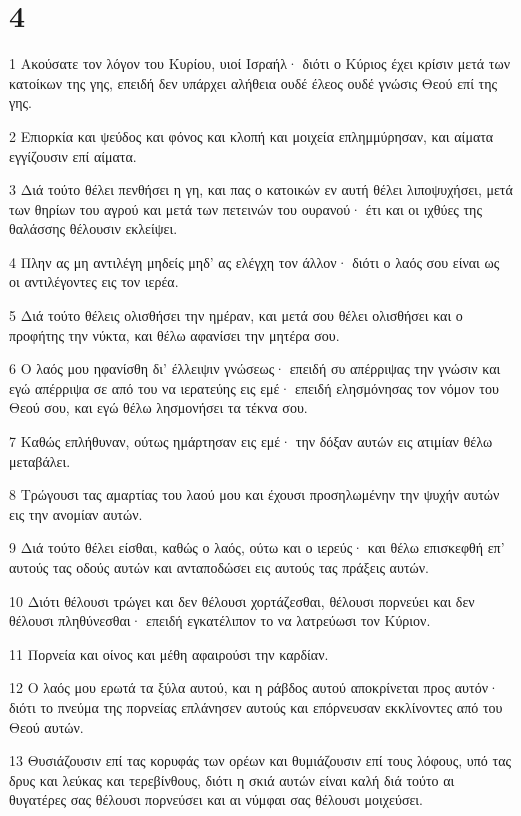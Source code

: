 \chapter{4}

\par 1 Ακούσατε τον λόγον του Κυρίου, υιοί Ισραήλ· διότι ο Κύριος έχει κρίσιν μετά των κατοίκων της γης, επειδή δεν υπάρχει αλήθεια ουδέ έλεος ουδέ γνώσις Θεού επί της γης.
\par 2 Επιορκία και ψεύδος και φόνος και κλοπή και μοιχεία επλημμύρησαν, και αίματα εγγίζουσιν επί αίματα.
\par 3 Διά τούτο θέλει πενθήσει η γη, και πας ο κατοικών εν αυτή θέλει λιποψυχήσει, μετά των θηρίων του αγρού και μετά των πετεινών του ουρανού· έτι και οι ιχθύες της θαλάσσης θέλουσιν εκλείψει.
\par 4 Πλην ας μη αντιλέγη μηδείς μηδ' ας ελέγχη τον άλλον· διότι ο λαός σου είναι ως οι αντιλέγοντες εις τον ιερέα.
\par 5 Διά τούτο θέλεις ολισθήσει την ημέραν, και μετά σου θέλει ολισθήσει και ο προφήτης την νύκτα, και θέλω αφανίσει την μητέρα σου.
\par 6 Ο λαός μου ηφανίσθη δι' έλλειψιν γνώσεως· επειδή συ απέρριψας την γνώσιν και εγώ απέρριψα σε από του να ιερατεύης εις εμέ· επειδή ελησμόνησας τον νόμον του Θεού σου, και εγώ θέλω λησμονήσει τα τέκνα σου.
\par 7 Καθώς επλήθυναν, ούτως ημάρτησαν εις εμέ· την δόξαν αυτών εις ατιμίαν θέλω μεταβάλει.
\par 8 Τρώγουσι τας αμαρτίας του λαού μου και έχουσι προσηλωμένην την ψυχήν αυτών εις την ανομίαν αυτών.
\par 9 Διά τούτο θέλει είσθαι, καθώς ο λαός, ούτω και ο ιερεύς· και θέλω επισκεφθή επ' αυτούς τας οδούς αυτών και ανταποδώσει εις αυτούς τας πράξεις αυτών.
\par 10 Διότι θέλουσι τρώγει και δεν θέλουσι χορτάζεσθαι, θέλουσι πορνεύει και δεν θέλουσι πληθύνεσθαι· επειδή εγκατέλιπον το να λατρεύωσι τον Κύριον.
\par 11 Πορνεία και οίνος και μέθη αφαιρούσι την καρδίαν.
\par 12 Ο λαός μου ερωτά τα ξύλα αυτού, και η ράβδος αυτού αποκρίνεται προς αυτόν· διότι το πνεύμα της πορνείας επλάνησεν αυτούς και επόρνευσαν εκκλίνοντες από του Θεού αυτών.
\par 13 Θυσιάζουσιν επί τας κορυφάς των ορέων και θυμιάζουσιν επί τους λόφους, υπό τας δρυς και λεύκας και τερεβίνθους, διότι η σκιά αυτών είναι καλή διά τούτο αι θυγατέρες σας θέλουσι πορνεύσει και αι νύμφαι σας θέλουσι μοιχεύσει.
